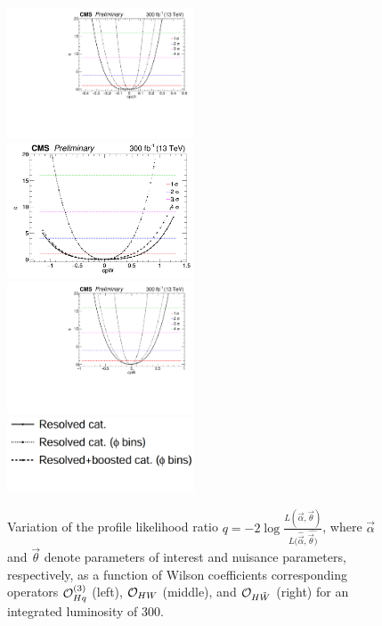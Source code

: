 \documentclass[a4paper,11pt]{article}
\begin{document}
\begin{figure}[hbtp]
\begin{center}
\includegraphics[width=0.495\textwidth]{Figures/RECO/Full_NLL_WC_cpq3i_fine_2019_opt2.pdf}
\includegraphics[width=0.495\textwidth]{Figures/RECO/Full_NLL_WC_cpW_fine_2019_opt2.png}
\includegraphics[width=0.495\textwidth]{Figures/RECO/Full_NLL_WC_cpWtilde_2019_opt2.pdf}  
\includegraphics[width=0.495\textwidth]{Figures/RECO/Selection_270.png}
\end{center}
\caption{
Variation of the profile likelihood ratio $q = -2\log\frac{L(\vec{\alpha},\vec{\theta})}{L(\hat{\vec{\alpha}},\hat{\vec{\theta})}}$, where $\vec{\alpha}$ and $\vec{\theta}$ denote parameters of interest and nuisance parameters, respectively, as a function of Wilson coefficients corresponding operators ${\cal O}^{(3)}_{Hq}$ (left), ${\cal O}_{HW}$ (middle), and ${\cal O}_{H\tilde{W}}$ (right) for an integrated luminosity of 300\fbinv.
}
\label{fig:NLL}
\end{figure}
\end{document}
